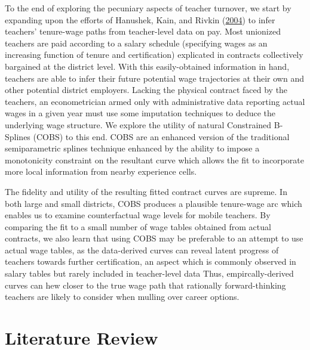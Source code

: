 \documentclass[12pt,]{article}
\newcommand{\TAG}[1]{}
\begin{document}
To the end of exploring the pecuniary aspects of teacher turnover, we
start by expanding upon the efforts of Hanushek, Kain, and Rivkin
(\protect\hyperlink{ref-hanushek}{2004}) to infer teachers' tenure-wage
paths from teacher-level data on pay. Most unionized teachers are paid
according to a salary schedule (specifying wages as an increasing
function of tenure and certification) explicated in contracts
collectively bargained at the district level. With this easily-obtained
information in hand, teachers are able to infer their future potential
wage trajectories at their own and other potential district employers.
Lacking the physical contract faced by the teachers, an econometrician
armed only with administrative data reporting actual wages in a given
year must use some imputation techniques to deduce the underlying wage
structure. We explore the utility of natural Constrained B-Splines
(COBS) to this end. COBS are an enhanced version of the traditional
semiparametric splines technique enhanced by the ability to impose a
monotonicity constraint on the resultant curve which allows the fit to
incorporate more local information from nearby experience cells.

The fidelity and utility of the resulting fitted contract curves are
supreme. In both large and small districts, COBS produces a plausible
tenure-wage arc which enables us to examine counterfactual wage levels
for mobile teachers. By comparing the fit to a small number of wage
tables obtained from actual contracts, we also learn that using COBS may
be preferable to an attempt to use actual wage tables, as the
data-derived curves can reveal latent progress of teachers towards
further certification, an aspect which is commonly observed in salary
tables but rarely included in teacher-level data Thus,
empircally-derived curves can hew closer to the true wage path that
rationally forward-thinking teachers are likely to consider when mulling
over career options.

\TAG{END_INTRO}

\TAG{BEGIN_BODY}

\section{Literature Review}\label{literature-review}
\end{document}
